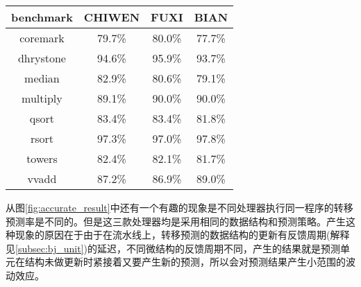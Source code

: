 \begin{table}[!htbp]
	\label{tab:accurate_result}
	\centering
	\footnotesize%
	\setlength{\tabcolsep}{4pt}%
	\renewcommand{\arraystretch}{1.2}%
	\begin{tabular}{cccc}
		\hline
		benchmark & CHIWEN & FUXI & BIAN \\%
		\hline
		coremark    & 79.7\% & 80.0\% & 77.7\% \\
		dhrystone   & 94.6\% & 95.9\% & 93.7\% \\
		median 		& 82.9\% & 80.6\% & 79.1\% \\
		multiply 	& 89.1\% & 90.0\% & 90.0\% \\
		qsort  		& 83.4\% & 83.4\% & 81.8\% \\
		rsort  		& 97.3\% & 97.0\% & 97.8\% \\
		towers 		& 82.4\% & 82.1\% & 81.7\% \\
		vvadd 		& 87.2\% & 86.9\% & 89.0\% \\
		\hline
	\end{tabular}
\end{table}

从图\ref{fig:accurate_result}中还有一个有趣的现象是不同处理器执行同一程序的转移预测率是不同的。但是这三款处理器均是采用相同的数据结构和预测策略。产生这种现象的原因在于由于在流水线上，转移预测的数据结构的更新有反馈周期(解释见\ref{subsec:bj_unit})的延迟，不同微结构的反馈周期不同，产生的结果就是预测单元在结构未做更新时紧接着又要产生新的预测，所以会对预测结果产生小范围的波动效应。

